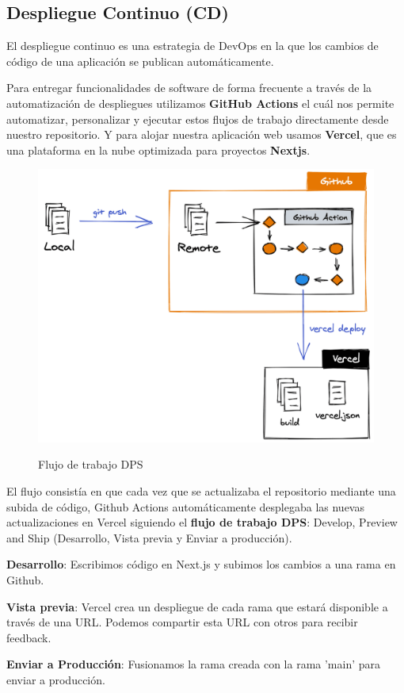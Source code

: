 \documentclass[12pt,twoside,titlepage]{report}
\begin{document}
\subsection{Despliegue Continuo (CD)}

El despliegue continuo es una estrategia de DevOps en la que los cambios de código de una aplicación se publican automáticamente.

Para entregar funcionalidades de software de forma frecuente a través de la automatización de despliegues utilizamos \textbf{GitHub Actions} el cuál nos permite automatizar, personalizar y ejecutar estos flujos de trabajo directamente desde nuestro repositorio. Y para alojar nuestra aplicación web usamos \textbf{Vercel}, que es una plataforma en la nube optimizada para proyectos \textbf{Nextjs}.

\begin{figure}[H]
    \centering
    \includegraphics[scale=0.3]{DevOps/DPS}
    \label{fig:vercel_workflow}
    \caption{Flujo de trabajo DPS}
\end{figure}

El flujo consistía en que cada vez que se actualizaba el repositorio mediante una subida de código, Github Actions automáticamente desplegaba las nuevas actualizaciones en Vercel siguiendo el \textbf{flujo de trabajo DPS}: Develop, Preview and Ship (Desarrollo, Vista previa y Enviar a producción).

\begin{compactitem}
    \item \textbf{Desarrollo}: Escribimos código en Next.js y subimos los cambios a una rama en Github.
    \item \textbf{Vista previa}: Vercel crea un despliegue de cada rama que estará disponible a través de una URL. Podemos compartir esta URL con otros para recibir feedback. 
    \item \textbf{Enviar a Producción}: Fusionamos la rama creada con la rama 'main' para enviar a producción.
\end{compactitem}
\end{document}
